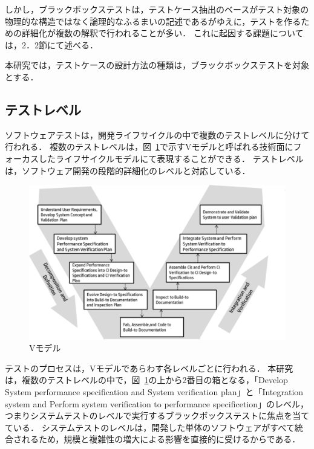 しかし，ブラックボックステストは，テストケース抽出のベースがテスト対象の物理的な構造ではなく論理的なふるまいの記述であるがゆえに，テストを作るための詳細化が複数の解釈で行われることが多い．
これに起因する課題については，2．2節にて述べる．

本研究では，テストケースの設計方法の種類は，ブラックボックステストを対象とする．

\subsection{テストレベル}

ソフトウェアテストは，開発ライフサイクルの中で複数のテストレベルに分けて行われる\cite{young2008software}．
複数のテストレベルは，図~\ref{fig:D-2-Fig1}で示すVモデルと呼ばれる技術面にフォーカスしたライフサイクルモデルにて表現することができる\cite{forsberg}．
テストレベルは，ソフトウェア開発の段階的詳細化のレベルと対応している\cite{pressman2005software}．

\begin{figure}[htbp]
  \begin{center}
  \includegraphics[width=12cm]{./image/D-2-Fig1.png}
  \caption{Vモデル}
  \label{fig:D-2-Fig1}
  \end{center}
\end{figure}

テストのプロセスは，Vモデルであらわす各レベルごとに行われる\cite{yumoto2006}．
本研究は，複数のテストレベルの中で，図~\ref{fig:D-2-Fig1}の上から2番目の箱となる，「Develop System performance specification and System verification plan」と「Integration system and Perform system verification to performance specificetion」のレベル，つまりシステムテストのレベルで実行するブラックボックステストに焦点を当てている．
システムテストのレベルは，開発した単体のソフトウェアがすべて統合されるため，規模と複雑性の増大による影響を直接的に受けるからである．

